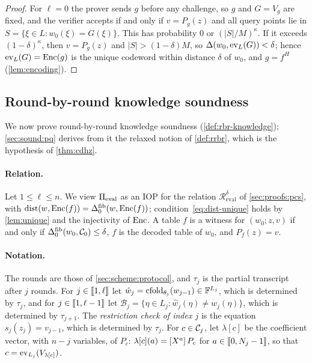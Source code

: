 \begin{proof}
For $\ell = 0$ the prover sends $g$ before any challenge, so $g$ and $G = V_g$ are fixed, and the verifier accepts if and only if $v = P_g(z)$ and all query points lie in $S = \{\xi \in L : w_0(\xi) = G(\xi)\}$.
This has probability $0$ or $(|S|/M)^\kappa$. If it exceeds $(1-\delta)^\kappa$, then $v = P_g(z)$ and $|S| > (1-\delta)M$, so $\Delta(w_0, \mathrm{ev}_L(G)) < \delta$; hence $\mathrm{ev}_L(G) = \mathrm{Enc}(g)$ is the unique codeword within distance $\delta$ of $w_0$, and $g = f^H$ (\cref{lem:encoding}).
\end{proof}

\subsection{Round-by-round knowledge soundness}\label{sec:sound:rbr}

We now prove round-by-round knowledge soundness (\cref{def:rbr-knowledge}); \cref{sec:sound:pq} derives from it the relaxed notion of \cref{def:rrbr}, which is the hypothesis of \cref{thm:cdhz}.

\paragraph{Relation.}
Let $1 \le \ell \le n$.
We view $\Pi_{\mathrm{eval}}$ as an IOP for the relation $\mathcal{R}^{\delta}_{\mathrm{eval}}$ of \cref{sec:proofs:pcs}, with $\mathrm{dist}(w, \mathrm{Enc}(f)) = \Delta^{\mathrm{fib}}_0(w, \mathrm{Enc}(f))$; condition~\eqref{eq:dist-unique} holds by \cref{lem:unique} and the injectivity of $\mathrm{Enc}$.
A table $f$ is a witness for $(w_0;z,v)$ if and only if $\Delta^{\mathrm{fib}}_0(w_0, \mathcal{C}_0) \le \delta$, $f$ is the decoded table of $w_0$, and $P_f(z) = v$.

\paragraph{Notation.}
The rounds are those of \cref{sec:scheme:protocol}, and $\tau_j$ is the partial transcript after $j$ rounds.
For $j \in \llbracket 1, \ell \rrbracket$ let $\hat w_j = \mathrm{cfold}_{\theta_j}(w_{j-1}) \in \mathbb{F}^{L_j}$, which is determined by $\tau_j$, and for $j \in \llbracket 1, \ell-1 \rrbracket$ let $\mathcal{B}_j = \{\eta \in L_j : \hat w_j(\eta) \ne w_j(\eta)\}$, which is determined by $\tau_{j+1}$.
The \emph{restriction check of index $j$} is the equation $s_j(z_j) = v_{j-1}$, which is determined by $\tau_j$.
For $c \in \mathcal{C}_j$, let $\lambda[c]$ be the coefficient vector, with $n-j$ variables, of $P_c$: $\lambda[c](a) = [X^{a}]\,P_c$ for $a \in \llbracket 0, N_j - 1 \rrbracket$, so that $c = \mathrm{ev}_{L_j}(V_{\lambda[c]})$.

